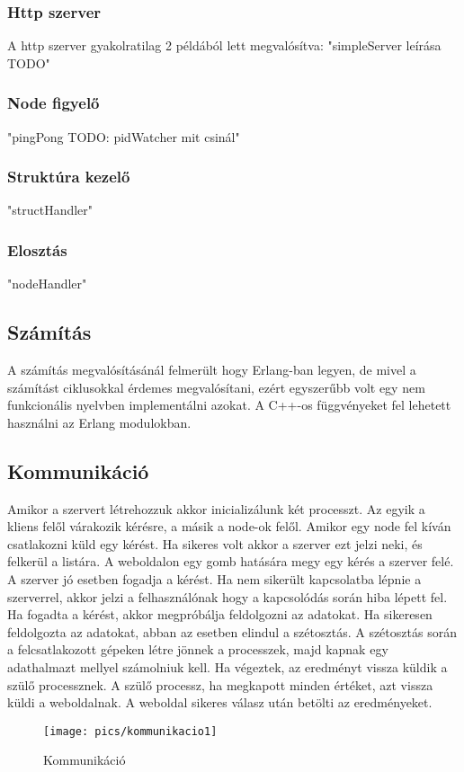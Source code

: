 	\subsubsection{Http szerver}
	A http szerver gyakolratilag 2 példából lett megvalósítva:
	"simpleServer leírása TODO"
	\subsubsection{Node figyelő}
	"pingPong TODO: pidWatcher mit csinál"
	\subsubsection{Struktúra kezelő}
	"structHandler"
	\subsubsection{Elosztás}
	"nodeHandler"

\subsection{Számítás}
	A számítás megvalósításánál felmerült hogy Erlang-ban legyen, de mivel a számítást ciklusokkal érdemes megvalósítani, ezért egyszerűbb volt egy nem funkcionális nyelvben implementálni azokat.
	A C++-os függvényeket fel lehetett használni az Erlang modulokban.
	\newline


\subsection{Kommunikáció}
	Amikor a szervert létrehozzuk akkor inicializálunk két processzt. Az egyik a kliens felől várakozik kérésre, a másik a node-ok felől. Amikor egy node fel kíván csatlakozni küld egy kérést. Ha sikeres volt akkor a szerver ezt jelzi neki, és felkerül a listára. \newline
	A weboldalon egy gomb hatására megy egy kérés a szerver felé. A szerver jó esetben fogadja a kérést. Ha nem sikerült kapcsolatba lépnie a szerverrel, akkor jelzi a felhasználónak hogy a kapcsolódás során hiba lépett fel. \newline
	Ha fogadta a kérést, akkor megpróbálja feldolgozni az adatokat. Ha sikeresen feldolgozta az adatokat, abban az esetben elindul a szétosztás. \newline
	A szétosztás során a felcsatlakozott gépeken létre jönnek a processzek, majd kapnak egy adathalmazt mellyel számolniuk kell. Ha végeztek, az eredményt vissza küldik a szülő processznek. A szülő processz, ha megkapott minden értéket, azt vissza küldi a weboldalnak.
	\newline
	A weboldal sikeres válasz után betölti az eredményeket. 
	\begin{figure}[h]
		\texttt{[image: pics/kommunikacio1]}
	\centering
	\caption{Kommunikáció\label{fig:kommunikacio1}}
	\end{figure}

